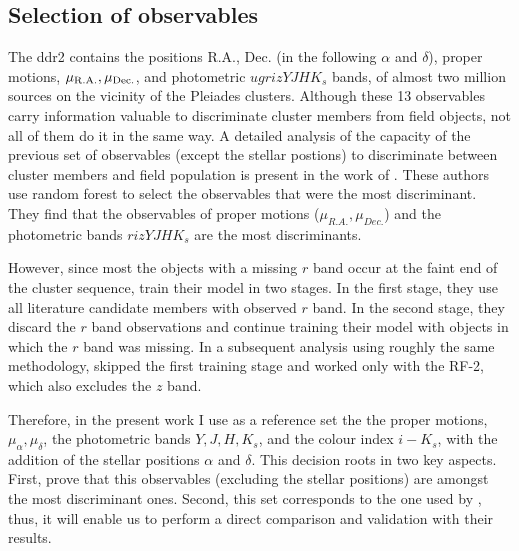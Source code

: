 \subsection{Selection of observables}
\label{sect:RF-2}
\sloppy
The \gls{ddr2} contains the positions R.A., Dec. (in the following $\alpha$ and $\delta$), proper motions, $\mu_{\rm{R.A.}},\mu_{\rm{Dec.}}$, and photometric $ugrizYJHK_s$ bands, of almost two million sources on the vicinity of the Pleiades clusters. Although these 13 observables carry information valuable to discriminate cluster members from field objects, not all of them do it in the same way. A detailed analysis of the capacity of the previous set of observables (except the stellar postions) to discriminate between cluster members and field population is present in the work of \citet{Sarro2014}. These authors use random forest to select the observables that were the most discriminant. They find that the observables of  proper motions ($\mu_{R.A.},\mu_{Dec.}$) and the photometric bands $rizYJHK_s$ are the most discriminants. 

However, since most the objects with a missing $r$ band occur at the faint end of the cluster sequence, \citet{Sarro2014} train their model in two stages. In the first stage, they use all literature candidate members with observed $r$ band. In the second stage, they discard the $r$ band observations and continue training their model with objects in which the $r$ band was missing.  In a subsequent analysis using roughly the same methodology, \citet{Bouy2015} skipped the first training stage and worked only with the RF-2, which also excludes the $z$ band.

Therefore, in the present work I use as a reference set the the proper motions, $\mu_{\alpha},\mu_{\delta}$, the photometric bands $Y,J,H,K_s$, and the colour index $i-K_s$, with the addition of the stellar positions  $\alpha$ and $\delta$. This decision roots in two key aspects. First,  \citet{Sarro2014} prove that this observables (excluding the stellar positions) are amongst the most discriminant ones. Second, this set corresponds to the one used by \cite{Bouy2015}, thus, it will enable us to perform a direct comparison and validation with their results. 


